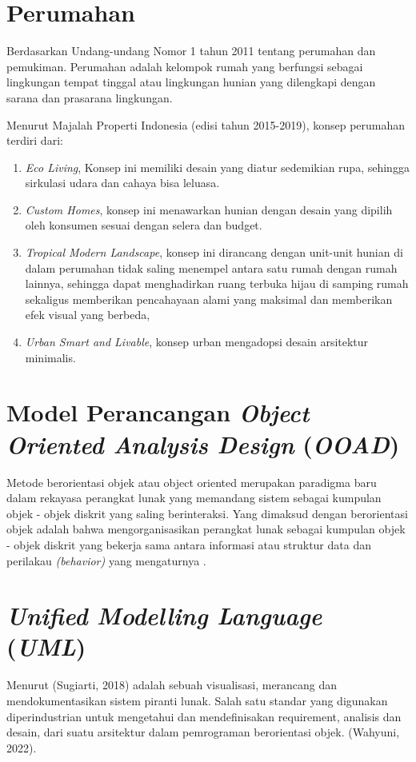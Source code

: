 \section{Perumahan}
Berdasarkan Undang-undang Nomor 1 tahun 2011 tentang perumahan dan pemukiman. Perumahan adalah kelompok rumah yang berfungsi sebagai lingkungan tempat tinggal atau lingkungan hunian yang dilengkapi dengan sarana dan prasarana lingkungan.
\par Menurut Majalah Properti Indonesia (edisi tahun 2015-2019), konsep perumahan terdiri dari: 
\begin{enumerate}
\item \textit{Eco Living}, Konsep ini memiliki desain yang diatur sedemikian rupa, sehingga sirkulasi udara dan cahaya bisa leluasa.
\item \textit{Custom Homes}, konsep ini menawarkan hunian dengan desain yang dipilih oleh konsumen sesuai dengan selera dan budget.
\item \textit{Tropical Modern Landscape}, konsep ini dirancang dengan unit-unit hunian di dalam perumahan tidak saling menempel antara satu rumah dengan rumah lainnya, sehingga dapat menghadirkan ruang terbuka hijau di samping rumah sekaligus memberikan pencahayaan alami yang maksimal dan memberikan efek visual yang berbeda, 
\item \textit{Urban Smart and Livable}, konsep urban mengadopsi desain arsitektur minimalis.
\end{enumerate}
\section{Model Perancangan \textit{Object Oriented Analysis Design} (\textit{OOAD}) }
Metode berorientasi objek atau object oriented merupakan paradigma baru dalam rekayasa perangkat lunak yang memandang sistem sebagai kumpulan objek - objek diskrit yang saling berinteraksi. Yang dimaksud dengan berorientasi objek adalah bahwa mengorganisasikan perangkat lunak sebagai kumpulan objek - objek diskrit yang bekerja sama antara informasi atau struktur data dan perilakau \textit{(behavior)} yang mengaturnya \cite{ariska2016rancang}.
\section{\textit{Unified Modelling Language} (\textit{UML})}
Menurut (Sugiarti, 2018) adalah sebuah visualisasi, merancang dan mendokumentasikan sistem piranti lunak. Salah satu standar yang digunakan diperindustrian untuk mengetahui dan mendefinisakan requirement, analisis dan desain, dari suatu arsitektur dalam pemrograman berorientasi objek. (Wahyuni, 2022).
